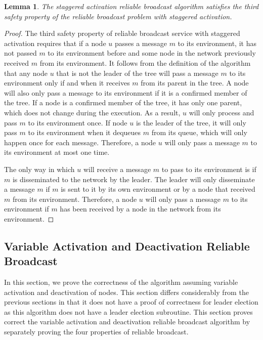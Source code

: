 \documentclass[english]{article}
\newtheorem{lemma}[theorem]{Lemma}
\begin{document}
\begin{lemma}
\label{StaggeredRBSafety3}
The staggered activation reliable broadcast algorithm satisfies the third safety property of the reliable broadcast problem with staggered activation.
\end{lemma}
\begin{proof}

The third safety property of reliable broadcast service with staggered activation requires that if a node $u$ passes a message $m$ to its environment, it has not passed $m$ to its environment before and some node in the network previously received $m$ from its environment. It follows from the definition of  the algorithm that any node $u$ that is not the leader of the tree will pass a message $m$ to its environment only if and when it receives $m$ from its parent in the tree. A node will also only pass a message to its environment if it is a confirmed member of the tree. If a node is a confirmed member of the tree, it has only one parent, which does not change during the execution. As a result, $u$ will only process and pass $m$ to its environment once. If node $u$ is the leader of the tree, it will only pass $m$ to its environment when it dequeues $m$ from its queue, which will only happen once for each message. Therefore, a node $u$ will only pass a message $m$ to its environment at most one time.

The only way in which $u$ will receive a message $m$ to pass to its environment is if $m$ is disseminated to the network by the leader. The leader will only disseminate a message $m$ if $m$ is sent to it by its own environment or by a node that received $m$ from its environment. Therefore, a node $u$ will only pass a message $m$ to its environment if $m$ has been received by a node in the network from its environment.

\end{proof}



\subsection {Variable Activation and Deactivation Reliable Broadcast}

In this section, we prove the correctness of the algorithm assuming variable activation and deactivation of nodes. This section differs considerably from the previous sections in that it does not have a proof of correctness for leader election as this algorithm does not have a leader election subroutine. This section proves correct the variable activation and deactivation reliable broadcast algorithm by separately proving the four properties of reliable broadcast.
\end{document}
